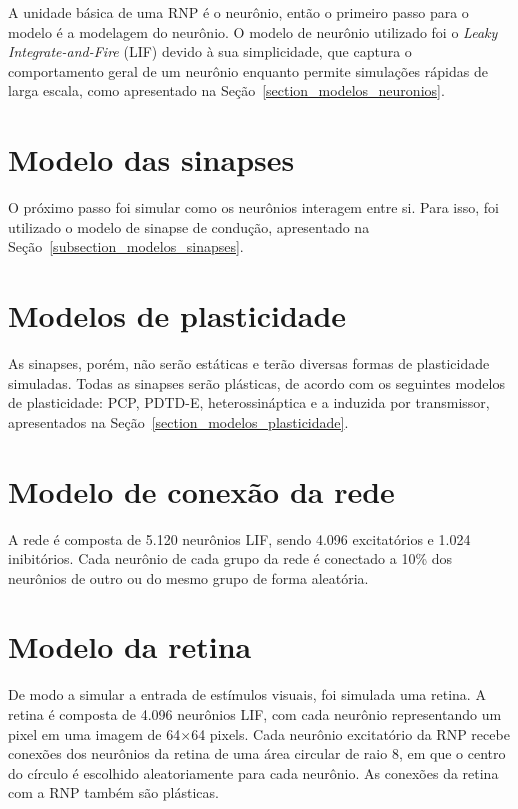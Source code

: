 A unidade básica de uma RNP é o neurônio, então o primeiro passo para o modelo é a modelagem do neurônio. O modelo de neurônio
utilizado foi o \textit{Leaky Integrate-and-Fire} (LIF) devido à sua simplicidade, que captura o comportamento geral de um
neurônio enquanto permite simulações rápidas de larga escala, como apresentado na Seção~\ref{section_modelos_neuronios}.

\section{Modelo das sinapses}

O próximo passo foi simular como os neurônios interagem entre si. Para isso, foi utilizado o modelo de sinapse de condução,
apresentado na Seção~\ref{subsection_modelos_sinapses}.

\section{Modelos de plasticidade}

As sinapses, porém, não serão estáticas e terão diversas formas de plasticidade simuladas. Todas as sinapses serão plásticas, de
acordo com os seguintes modelos de plasticidade: PCP, PDTD-E, heterossináptica e a induzida por transmissor, apresentados na
Seção~\ref{section_modelos_plasticidade}.

\section{Modelo de conexão da rede}

A rede é composta de 5.120 neurônios LIF, sendo 4.096 excitatórios e 1.024 inibitórios. Cada neurônio de cada grupo da rede é
conectado a 10\% dos neurônios de outro ou do mesmo grupo de forma aleatória.

\section{Modelo da retina}

De modo a simular a entrada de estímulos visuais, foi simulada uma retina. A retina é composta de 4.096 neurônios LIF, com cada
neurônio representando um pixel em uma imagem de 64$\times$64 pixels. Cada neurônio excitatório da RNP recebe conexões dos
neurônios da retina de uma área circular de raio 8, em que o centro do círculo é escolhido aleatoriamente para cada neurônio. As
conexões da retina com a RNP também são plásticas.

